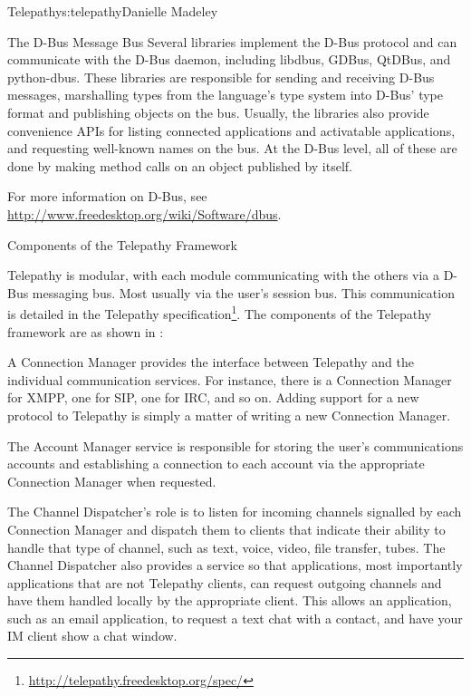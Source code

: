 \begin{aosachapter}{Telepathy}{s:telepathy}{Danielle Madeley}
\begin{aosabox}{The D-Bus Message Bus}
Several libraries implement the D-Bus protocol and can communicate
with the D-Bus daemon, including libdbus, GDBus, QtDBus, and
python-dbus. These libraries are responsible for sending and receiving
D-Bus messages, marshalling types from the language's type system into
D-Bus' type format and publishing objects on the bus.  Usually, the
libraries also provide convenience APIs for listing connected
applications and activatable applications, and requesting well-known
names on the bus.  At the D-Bus level, all of these are done by making
method calls on an object published by  itself.

For more information on D-Bus, see
\url{http://www.freedesktop.org/wiki/Software/dbus}.

\end{aosabox}

\begin{aosasect1}{Components of the Telepathy Framework}

Telepathy is modular, with each module communicating with the others
via a D-Bus messaging bus. Most usually via the user's session bus. This
communication is detailed in the Telepathy
specification\footnote{\url{http://telepathy.freedesktop.org/spec/}}.
The components of the Telepathy framework are as shown in
:

\begin{aosaitemize}

  \item A Connection Manager provides the interface between Telepathy
    and the individual communication services. For instance, there is
    a Connection Manager for XMPP, one for SIP, one for IRC, and so
    on.  Adding support for a new protocol to Telepathy is simply a
    matter of writing a new Connection Manager.

  \item The Account Manager service is responsible for storing the
    user's communications accounts and establishing a connection to
    each account via the appropriate Connection Manager when
    requested.

  \item The Channel Dispatcher's role is to listen for incoming
    channels signalled by each Connection Manager and dispatch them to
    clients that indicate their ability to handle that type of
    channel, such as text, voice, video, file transfer, tubes.  The
    Channel Dispatcher also provides a service so that applications,
    most importantly applications that are not Telepathy clients, can
    request outgoing channels and have them handled locally by the
    appropriate client. This allows an application, such as an email
    application, to request a text chat with a contact, and have your
    IM client show a chat window.


\end{aosaitemize}
\end{aosasect1}
\end{aosachapter}
